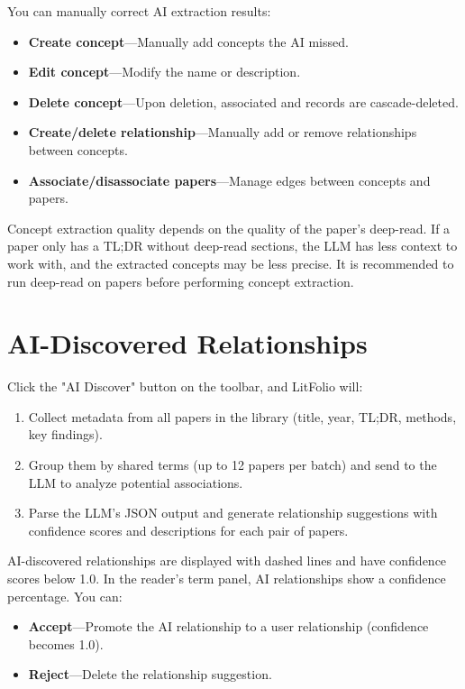 You can manually correct AI extraction results:

\begin{itemize}
  \item \textbf{Create concept}---Manually add concepts the AI missed.
  \item \textbf{Edit concept}---Modify the name or description.
  \item \textbf{Delete concept}---Upon deletion, associated  and
     records are cascade-deleted.
  \item \textbf{Create/delete relationship}---Manually add or remove relationships between
    concepts.
  \item \textbf{Associate/disassociate papers}---Manage  edges between concepts
    and papers.
\end{itemize}

\begin{tipbox}
Concept extraction quality depends on the quality of the paper's deep-read. If a paper only has a
TL;DR without deep-read sections, the LLM has less context to work with, and the extracted concepts
may be less precise. It is recommended to run deep-read on papers before performing concept
extraction.
\end{tipbox}

\section{AI-Discovered Relationships}

Click the "AI Discover" button on the toolbar, and LitFolio will:

\begin{enumerate}
  \item Collect metadata from all papers in the library (title, year, TL;DR, methods, key findings).
  \item Group them by shared terms (up to 12 papers per batch) and send to the LLM to analyze
    potential associations.
  \item Parse the LLM's JSON output and generate relationship suggestions with confidence scores
    and descriptions for each pair of papers.
\end{enumerate}

AI-discovered relationships are displayed with dashed lines and have confidence scores below 1.0.
In the reader's term panel, AI relationships show a confidence percentage. You can:

\begin{itemize}
  \item \textbf{Accept}---Promote the AI relationship to a user relationship (confidence becomes
    1.0).
  \item \textbf{Reject}---Delete the relationship suggestion.
\end{itemize}

